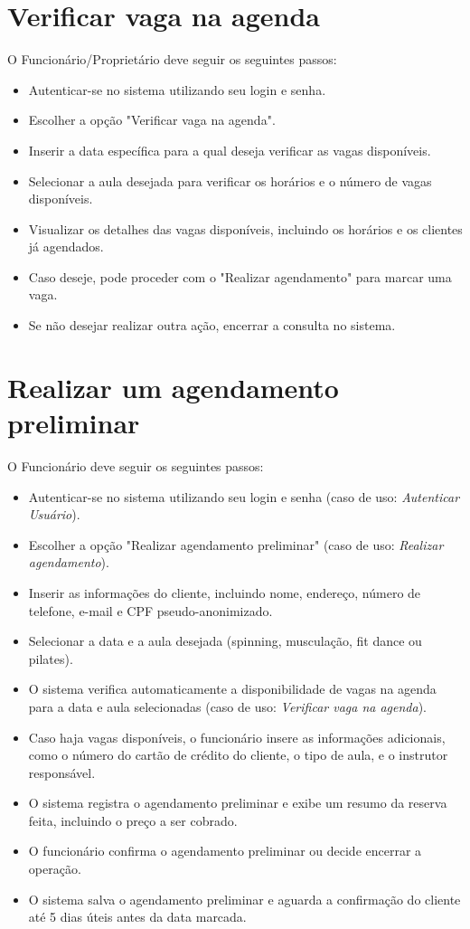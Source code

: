 \section*{Verificar vaga na agenda}

O Funcionário/Proprietário deve seguir os seguintes passos:
\begin{itemize}
    \item Autenticar-se no sistema utilizando seu login e senha.
    \item Escolher a opção "Verificar vaga na agenda".
    \item Inserir a data específica para a qual deseja verificar as vagas disponíveis.
    \item Selecionar a aula desejada para verificar os horários e o número de vagas disponíveis.
    \item Visualizar os detalhes das vagas disponíveis, incluindo os horários e os clientes já agendados.
    \item Caso deseje, pode proceder com o "Realizar agendamento" para marcar uma vaga.
    \item Se não desejar realizar outra ação, encerrar a consulta no sistema.
\end{itemize}

\newpage %

\section*{Realizar um agendamento preliminar}

O Funcionário deve seguir os seguintes passos:
\begin{itemize}
    \item Autenticar-se no sistema utilizando seu login e senha (caso de uso: \textit{Autenticar Usuário}).
    \item Escolher a opção "Realizar agendamento preliminar" (caso de uso: \textit{Realizar agendamento}).
    \item Inserir as informações do cliente, incluindo nome, endereço, número de telefone, e-mail e CPF pseudo-anonimizado.
    \item Selecionar a data e a aula desejada (spinning, musculação, fit dance ou pilates).
    \item O sistema verifica automaticamente a disponibilidade de vagas na agenda para a data e aula selecionadas (caso de uso: \textit{Verificar vaga na agenda}).
    \item Caso haja vagas disponíveis, o funcionário insere as informações adicionais, como o número do cartão de crédito do cliente, o tipo de aula, e o instrutor responsável.
    \item O sistema registra o agendamento preliminar e exibe um resumo da reserva feita, incluindo o preço a ser cobrado.
    \item O funcionário confirma o agendamento preliminar ou decide encerrar a operação.
    \item O sistema salva o agendamento preliminar e aguarda a confirmação do cliente até 5 dias úteis antes da data marcada.
\end{itemize}

